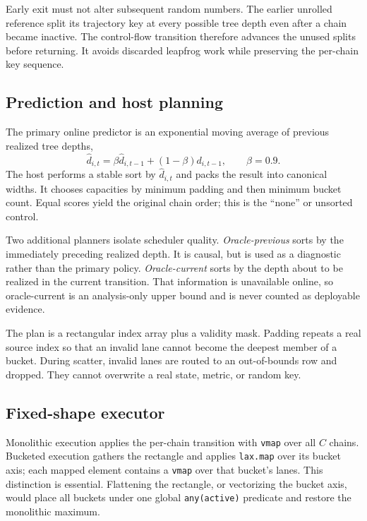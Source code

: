 \documentclass[conference]{IEEEtran}
\begin{document}
Early exit must not alter subsequent random numbers.  The earlier unrolled
reference split its trajectory key at every possible tree depth even after a
chain became inactive.  The control-flow transition therefore advances the
unused splits before returning.  It avoids discarded leapfrog work while
preserving the per-chain key sequence.

\subsection{Prediction and host planning}

The primary online predictor is an exponential moving average of previous
realized tree depths,
\begin{equation}
  \widehat d_{i,t}=\beta\widehat d_{i,t-1}
       +(1-\beta)d_{i,t-1}, \qquad \beta=0.9.
  \label{eq:history}
\end{equation}
The host performs a stable sort by $\widehat d_{i,t}$ and packs the result into
canonical widths.  It chooses capacities by minimum padding and then minimum
bucket count.  Equal scores yield the original chain order; this is the
``none'' or unsorted control.

Two additional planners isolate scheduler quality.  \emph{Oracle-previous}
sorts by the immediately preceding realized depth.  It is causal, but is used
as a diagnostic rather than the primary policy.  \emph{Oracle-current} sorts by
the depth about to be realized in the current transition.  That information is
unavailable online, so oracle-current is an analysis-only upper bound and is
never counted as deployable evidence.

The plan is a rectangular index array plus a validity mask.  Padding repeats a
real source index so that an invalid lane cannot become the deepest member of a
bucket.  During scatter, invalid lanes are routed to an out-of-bounds row and
dropped.  They cannot overwrite a real state, metric, or random key.

\subsection{Fixed-shape executor}

Monolithic execution applies the per-chain transition with \texttt{vmap} over
all $C$ chains.  Bucketed execution gathers the rectangle and applies
\texttt{lax.map} over its bucket axis; each mapped element contains a
\texttt{vmap} over that bucket's lanes.  This distinction is essential.
Flattening the rectangle, or vectorizing the bucket axis, would place all
buckets under one global \texttt{any(active)} predicate and restore the
monolithic maximum.
\end{document}
